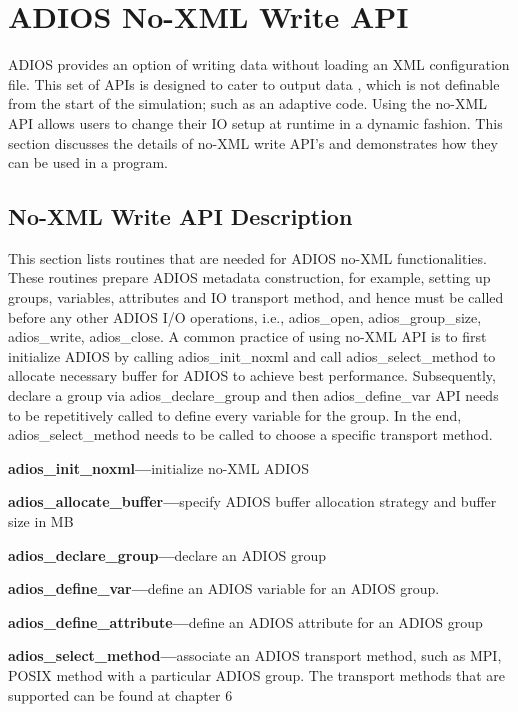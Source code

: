 \chapter{ADIOS No-XML Write API }

ADIOS provides an option of writing data without loading an XML configuration file. 
This set of APIs is designed to cater to output data , which is not definable from 
the start of the simulation; such as an adaptive code. Using the no-XML API allows 
users to change their IO setup at runtime in a dynamic fashion.  This section discusses 
the details of no-XML write API's and demonstrates how they can be used in a program. 
 \label{HToc182553355}

\section{No-XML Write API Description}

This section lists routines that are needed for ADIOS no-XML functionalities. These 
routines prepare ADIOS metadata construction, for example, setting up groups, variables, 
attributes and IO transport method, and hence must be called before any other ADIOS 
I/O operations, i.e., adios\_open, adios\_group\_size, adios\_write, adios\_close. 
A common practice of using no-XML API is to first initialize ADIOS by calling adios\_init\_noxml 
and call adios\_select\_method to allocate necessary buffer for ADIOS to achieve 
best performance. Subsequently, declare a group via adios\_declare\_group and then 
adios\_define\_var API needs to be repetitively called to define every variable 
for the group.  In the end, adios\_select\_method needs to be called to choose 
a specific transport method.

\textbf{adios\_init\_noxml---}initialize no-XML ADIOS

\textbf{adios\_allocate\_buffer---}specify ADIOS buffer allocation strategy and 
buffer size in MB

\textbf{adios\_declare\_group---}declare an ADIOS group 

\textbf{adios\_define\_var---}define an ADIOS variable for an ADIOS group.

\textbf{adios\_define\_attribute---}define an ADIOS attribute for an ADIOS group

\textbf{adios\_select\_method---}associate an ADIOS transport method, such as MPI, 
POSIX method with a particular ADIOS group. The transport methods that are supported 
can be found at chapter 6\label{HToc182553356}

